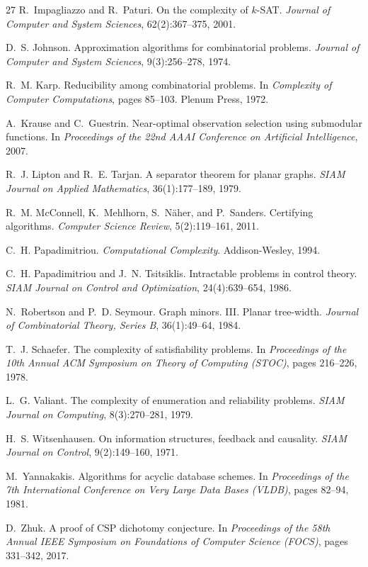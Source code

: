 \documentclass[11pt]{article}
\theoremstyle{plain}
\theoremstyle{definition}
\theoremstyle{remark}
\begin{document}
\begin{thebibliography}{27}
 R.~Impagliazzo and R.~Paturi.
On the complexity of $k$-SAT. \emph{Journal of Computer and System
Sciences}, 62(2):367--375, 2001.

 D.~S. Johnson. Approximation algorithms for combinatorial
problems. \emph{Journal of Computer and System Sciences}, 9(3):256--278,
1974.

 R.~M. Karp. Reducibility among combinatorial problems.
In \emph{Complexity of Computer Computations}, pages 85--103. Plenum Press,
1972.

 A.~Krause and C.~Guestrin. Near-optimal
observation selection using submodular functions. In \emph{Proceedings of
the 22nd AAAI Conference on Artificial Intelligence}, 2007.

 R.~J. Lipton and R.~E. Tarjan. A separator theorem
for planar graphs. \emph{SIAM Journal on Applied Mathematics},
36(1):177--189, 1979.

 R.~M. McConnell, K.~Mehlhorn, S.~N\"aher, and P.~Sanders.
Certifying algorithms. \emph{Computer Science Review}, 5(2):119--161, 2011.

 C.~H. Papadimitriou. \emph{Computational
Complexity}. Addison-Wesley, 1994.

 C.~H. Papadimitriou and J.~N. Tsitsiklis.
Intractable problems in control theory. \emph{SIAM Journal on Control and
Optimization}, 24(4):639--654, 1986.

 N.~Robertson and P.~D. Seymour.
Graph minors. III. Planar tree-width. \emph{Journal of Combinatorial Theory,
Series B}, 36(1):49--64, 1984.

 T.~J. Schaefer. The complexity of satisfiability
problems. In \emph{Proceedings of the 10th Annual ACM Symposium on Theory of
Computing (STOC)}, pages 216--226, 1978.

 L.~G. Valiant. The complexity of enumeration and
reliability problems. \emph{SIAM Journal on Computing}, 8(3):270--281, 1979.

 H.~S. Witsenhausen. On information structures,
feedback and causality. \emph{SIAM Journal on Control}, 9(2):149--160, 1971.

 M.~Yannakakis. Algorithms for acyclic database
schemes. In \emph{Proceedings of the 7th International Conference on Very
Large Data Bases (VLDB)}, pages 82--94, 1981.

 D.~Zhuk. A proof of CSP dichotomy conjecture. In
\emph{Proceedings of the 58th Annual IEEE Symposium on Foundations of
Computer Science (FOCS)}, pages 331--342, 2017.

\end{thebibliography}
\end{document}
